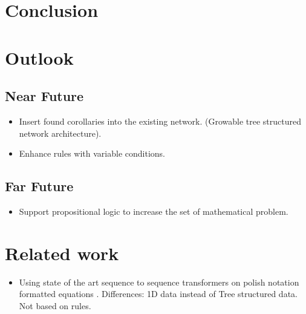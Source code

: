 \documentclass{scrartcl}
\theoremstyle{definition}
\begin{document}
\section{Conclusion}

\section{Outlook}
\subsection{Near Future}
\begin{itemize}
	\item Insert found corollaries into the existing network. (Growable tree structured network architecture). \cite{graves2016hybrid}
	\item Enhance rules with variable conditions.
\end{itemize}

\subsection{Far Future}
\begin{itemize}
	\item Support propositional logic to increase the set of mathematical problem.
\end{itemize}

\section{Related work}

\begin{itemize}
	\item Using state of the art sequence to sequence transformers on polish notation formatted equations \cite{Lample2020Deep}. Differences: 1D data instead of Tree structured data. Not based on rules. 
\end{itemize}

\printbibliography
\end{document}
